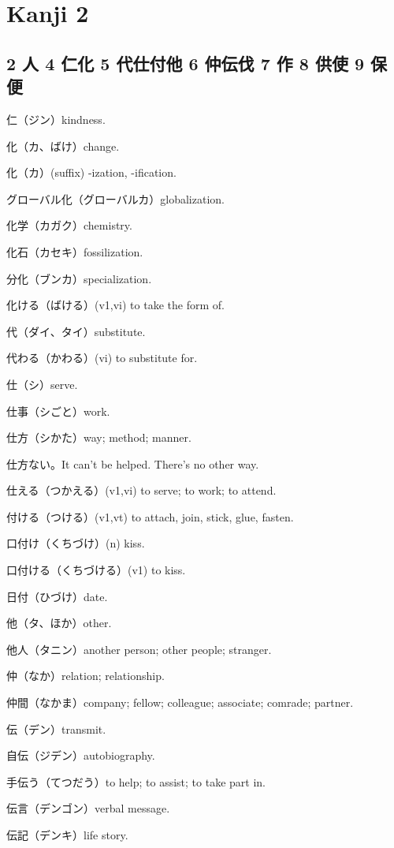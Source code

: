 \chapter{Kanji 2}

\section{2 人 4 仁化 5 代仕付他 6 仲伝伐 7 作 8 供使 9 保便}

仁（ジン）kindness.

化（カ、ばけ）change.

化（カ）(suffix) -ization, -ification.

グローバル化（グローバルカ）globalization.

化学（カガク）chemistry.

化石（カセキ）fossilization.

分化（ブンカ）specialization.

化ける（ばける）(v1,vi) to take the form of.

代（ダイ、タイ）substitute.

代わる（かわる）(vi) to substitute for.

仕（シ）serve.

仕事（シごと）work.

仕方（シかた）way; method; manner.

仕方ない。It can't be helped. There's no other way.

仕える（つかえる）(v1,vi) to serve; to work; to attend.

付ける（つける）(v1,vt) to attach, join, stick, glue, fasten.

口付け（くちづけ）(n) kiss.

口付ける（くちづける）(v1) to kiss.

日付（ひづけ）date.

他（タ、ほか）other.

他人（タニン）another person; other people; stranger.

仲（なか）relation; relationship.

仲間（なかま）company; fellow; colleague; associate; comrade; partner.

伝（デン）transmit.

自伝（ジデン）autobiography.

手伝う（てつだう）to help; to assist; to take part in.

伝言（デンゴン）verbal message.

伝記（デンキ）life story.

